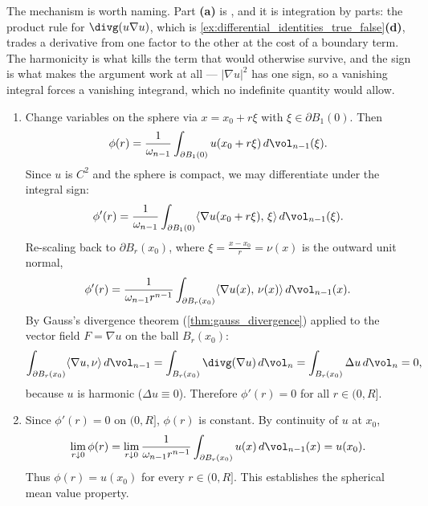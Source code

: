 \begin{exercisesolution}
\begin{remark}
The mechanism is worth naming. Part \textbf{(a)} is , and it is
integration by parts: the product rule for $\divg(u\nabla u)$, which is
\cref{ex:differential_identities_true_false}\textbf{(d)}, trades a derivative from one factor to
the other at the cost of a boundary term. The harmonicity is what kills the term that would
otherwise survive, and the sign is what makes the argument work at all --- $\lvert\nabla
u\rvert^2$ has one sign, so a vanishing integral forces a vanishing integrand, which no
indefinite quantity would allow.
\end{remark}
\end{exercisesolution}

\begin{exercisesolution}
\label{sol:harmonic_mean_value_maximum_principle}
\begin{enumerate}[label=\textbf{(\alph*)}]
  \item Change variables on the sphere via $x = x_0 + r\xi$ with $\xi \in \partial B_1(0)$. Then
    \[\phi(r) = \frac{1}{\omega_{n-1}} \int_{\partial B_1(0)} u(x_0 + r\xi) \, d\vol_{n-1}(\xi).\]
    Since $u$ is $C^2$ and the sphere is compact, we may differentiate under the integral sign:
    \[\phi'(r) = \frac{1}{\omega_{n-1}} \int_{\partial B_1(0)} \langle \nabla u(x_0 + r\xi),\, \xi \rangle \, d\vol_{n-1}(\xi).\]
    Re-scaling back to $\partial B_r(x_0)$, where $\xi = \frac{x - x_0}{r} = \nu(x)$ is the outward unit normal,
    \[\phi'(r) = \frac{1}{\omega_{n-1} r^{n-1}} \int_{\partial B_r(x_0)} \langle \nabla u(x),\, \nu(x) \rangle \, d\vol_{n-1}(x).\]
    By Gauss's divergence theorem (\cref{thm:gauss_divergence}) applied to the vector field $F = \nabla u$ on the ball $B_r(x_0)$:
    \[\int_{\partial B_r(x_0)} \langle \nabla u, \nu \rangle \, d\vol_{n-1} = \int_{B_r(x_0)} \divg(\nabla u) \, d\vol_n = \int_{B_r(x_0)} \Delta u \, d\vol_n = 0,\]
    because $u$ is harmonic ($\Delta u \equiv 0$). Therefore $\phi'(r) = 0$ for all $r \in (0, R]$.

  \item Since $\phi'(r) = 0$ on $(0, R]$, $\phi(r)$ is constant. By continuity of $u$ at $x_0$,
    \[\lim_{r \downarrow 0} \phi(r) = \lim_{r \downarrow 0} \frac{1}{\omega_{n-1} r^{n-1}} \int_{\partial B_r(x_0)} u(x) \, d\vol_{n-1}(x) = u(x_0).\]
    Thus $\phi(r) = u(x_0)$ for every $r \in (0, R]$. This establishes the spherical mean value property.


\end{enumerate}
\end{exercisesolution}
